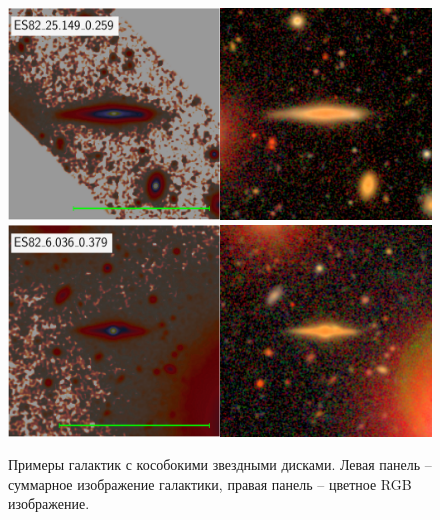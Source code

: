 \begin{figure}[ht]

    \includegraphics[width=.5\textwidth]{images/45.png}\hfill
    \includegraphics[width=.5\textwidth]{images/118.png}\hfill

    \caption{Примеры галактик с кособокими звездными дисками. Левая панель -- суммарное изображение галактики, правая панель -- цветное RGB изображение.}\label{fig:lopsided}
\end{figure}
